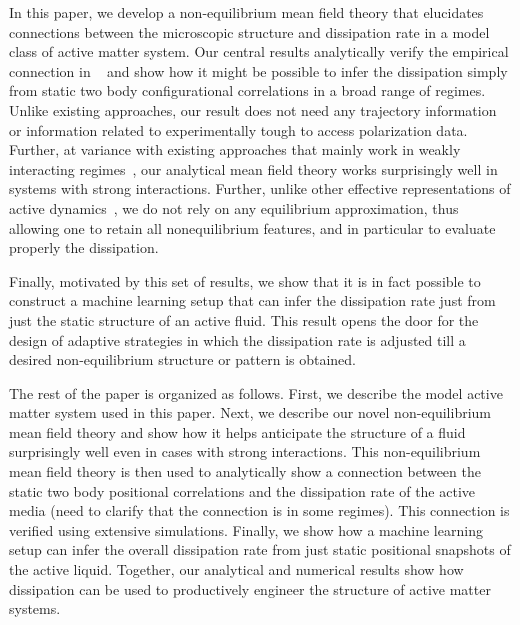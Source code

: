 \documentclass[amsmath,preprintnumbers,10pt,nofootinbib,prl,twocolumn]{revtex4-1}
\begin{document}
In this paper, we develop a non-equilibrium mean field theory that elucidates connections between the microscopic structure and dissipation rate in a model class of active matter system. Our central results analytically verify the empirical connection in ~\cite{Suri2019} and show how it might be possible to infer the dissipation simply from static two body configurational correlations in a broad range of regimes. Unlike existing approaches, our result does not need any trajectory information or information related to experimentally tough to access polarization data. Further, at variance with existing approaches that mainly work in weakly interacting regimes~\cite{Dean_1996}, our analytical mean field theory works surprisingly well in systems with strong interactions. Further, unlike other effective representations of active dynamics~\cite{Maggi2015, Rein2016, Wittmann2017}, we do not rely on any equilibrium approximation, thus allowing one to retain all nonequilibrium features, and in particular to evaluate properly the dissipation.

Finally, motivated by this set of results, we show that it is in fact possible to construct a machine learning setup that can infer the dissipation rate just from just the static structure of an active fluid. This result opens the door for the design of adaptive strategies in which the dissipation rate is adjusted till a desired non-equilibrium structure or pattern is obtained. 

The rest of the paper is organized as follows. First, we describe the model active matter system used in this paper. Next, we describe our novel non-equilibrium mean field theory and show how it helps anticipate the structure of a fluid surprisingly well even in cases with strong interactions. This non-equilibrium mean field theory is then used to analytically show a connection between the static two body positional correlations and the dissipation rate of the active media (need to clarify that the connection is in some regimes). This connection is verified using extensive simulations. Finally, we show how a machine learning setup can infer the overall dissipation rate from just static positional snapshots of the active liquid. Together, our analytical and numerical results show how dissipation can be used to productively engineer the structure of active matter systems. 


\end{document}
